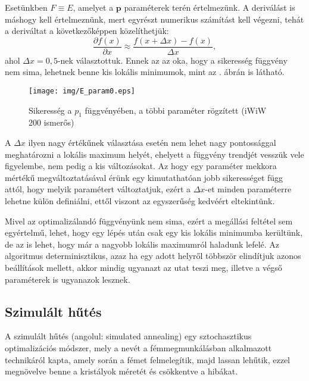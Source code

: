 \documentclass[12pt]{article}
\begin{document}
Esetünkben $F \equiv E$, amelyet a $\mathbf{p}$ paraméterek terén értelmezünk. A deriválást is máshogy kell értelmeznünk, mert egyrészt numerikus számítást kell végezni, tehát a deriváltat a következőképpen közelíthetjük:
\begin{equation}
	\frac{\partial f(x)}{\partial x} \approx \frac{f(x+\Delta x) - f(x)}{\Delta x},
\end{equation}
ahol $\Delta x = 0{,}5$-nek választottuk. Ennek az az oka, hogy a sikeresség függvény nem sima, lehetnek benne kis lokális minimumok, mint az . ábrán is látható. 
\begin{figure}[H]
	\centering
	\texttt{[image: img/E\_param0.eps]}
	\caption{Sikeresség a $p_1$ függvényében, a többi paraméter rögzített (iWiW 200 ismerős)}
	\label{E_param1}
\end{figure}
A $\Delta x$ ilyen nagy értékűnek választása esetén nem lehet nagy pontossággal meghatározni a lokális maximum helyét, ehelyett a függvény trendjét vesszük vele figyelembe, nem pedig a kis változásokat. Az hogy egy paraméter mekkora mértékű megváltoztatásával érünk egy kimutathatóan jobb sikerességet függ attól, hogy melyik paramétert változtatjuk, ezért a $\Delta x$-et minden paraméterre lehetne külön definiálni, ettől viszont az egyszerűség kedvéért eltekintünk.

Mivel az optimalizálandó függvényünk nem sima, ezért a megállási feltétel sem egyértelmű, lehet, hogy egy lépés után csak egy kis lokális minimumba kerültünk, de az is lehet, hogy már a nagyobb lokális maximumról haladunk lefelé.
Az algoritmus determinisztikus, azaz ha egy adott helyről többször elindítjuk azonos beállítások mellett, akkor mindig ugyanazt az utat teszi meg, illetve a végső paraméterek is ugyanazok lesznek.
\subsection{Szimulált hűtés}
A szimulált hűtés (angolul: simulated annealing) \cite{simulated_annealing} egy sztochasztikus optimalizációs módszer, mely a nevét a fémmegmunkálásban alkalmazott technikáról kapta, amely során a fémet felmelegítik, majd lassan lehűtik, ezzel megnövelve benne a kristályok méretét és csökkentve a hibákat.
\end{document}
